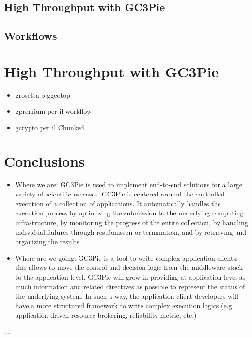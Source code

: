 \documentclass{PoS}
\begin{document}
\subsection{High Throughput with GC3Pie}

\subsection{Workflows}

\section{High Throughput with GC3Pie}
\begin{itemize}
\item grosetta o ggeotop
\item gpremium per il workflow
\item gcrypto per il Chunked
\end{itemize}


\section{Conclusions}
\begin{itemize}
  \item Where we are: GC3Pie is used to implement end-to-end solutions for a large variety of scientific usecases. GC3Pie is centered around the controlled execution of a collection of applications. It automatically handles the execution process by optimizing the submission to the underlying computing infrastructure, by monitoring the progress of the entire collection, by handling individual failures through resubmisson or termination, and by retrieving and organizing the results.

  \item Where are we going: GC3Pie is a tool to write complex application clients; this allows to move the control and decision logic from the middleware stack to the application level. GC3Pie will grow in providing at application level as much information and related directives as possible to represent the status of the underlying system. In such a way, the application client developers will have a more structured framework to write complex execution logics (e.g. application-driven resource brokering, reliability metric, etc.)
\end{itemize}

\begin{thebibliography}{99}
   ....
\end{thebibliography}
\end{document}

